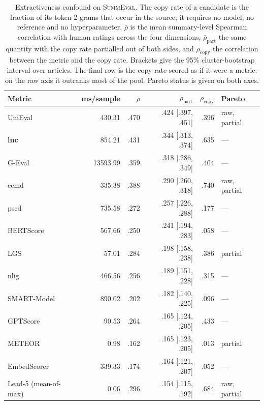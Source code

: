 \begin{table}[t]
\centering
\caption{Extractiveness confound on \textsc{SummEval}. The copy rate of a candidate is the fraction of its token 2-grams that occur in the source; it requires no model, no reference and no hyperparameter. $\bar{\rho}$ is the mean summary-level Spearman correlation with human ratings across the four dimensions, $\bar{\rho}_{\mathrm{part}}$ the same quantity with the copy rate partialled out of both sides, and $\rho_{\mathrm{copy}}$ the correlation between the metric and the copy rate. Brackets give the 95\% cluster-bootstrap interval over articles. The final row is the copy rate scored as if it were a metric: on the raw axis it outranks most of the pool. Pareto status is given on both axes.}
\label{tab:confound}
\small
\linespread{1}\selectfont
\setlength{\tabcolsep}{4pt}
\begin{tabular}{@{}lrrrrl@{}}
\toprule
Metric & ms/sample & $\bar{\rho}$ & $\bar{\rho}_{\mathrm{part}}$ & $\rho_{\mathrm{copy}}$ & Pareto \\
\midrule
UniEval & 430.31 & .470 & .424 {\scriptsize [.397, .451]} & .396 & raw, partial \\
\textbf{lnc} & 854.21 & .431 & .344 {\scriptsize [.313, .374]} & .635 & --- \\
G-Eval & 13593.99 & .359 & .318 {\scriptsize [.286, .349]} & .404 & --- \\
ccmd & 335.38 & .388 & .290 {\scriptsize [.260, .318]} & .740 & raw, partial \\
pscd & 735.58 & .272 & .257 {\scriptsize [.226, .288]} & .177 & --- \\
BERTScore & 567.66 & .250 & .241 {\scriptsize [.194, .283]} & .058 & --- \\
LGS & 57.01 & .284 & .198 {\scriptsize [.158, .238]} & .386 & partial \\
nlig & 466.56 & .256 & .189 {\scriptsize [.151, .228]} & .315 & --- \\
SMART-Model & 890.02 & .202 & .182 {\scriptsize [.140, .225]} & .096 & --- \\
GPTScore & 90.53 & .264 & .165 {\scriptsize [.124, .205]} & .433 & --- \\
METEOR & 0.98 & .162 & .165 {\scriptsize [.123, .205]} & .013 & partial \\
EmbedScorer & 339.33 & .174 & .164 {\scriptsize [.121, .207]} & .052 & --- \\
Lead-5 (mean-of-max) & 0.06 & .296 & .154 {\scriptsize [.115, .192]} & .684 & raw, partial \\

\end{tabular}
\end{table}
